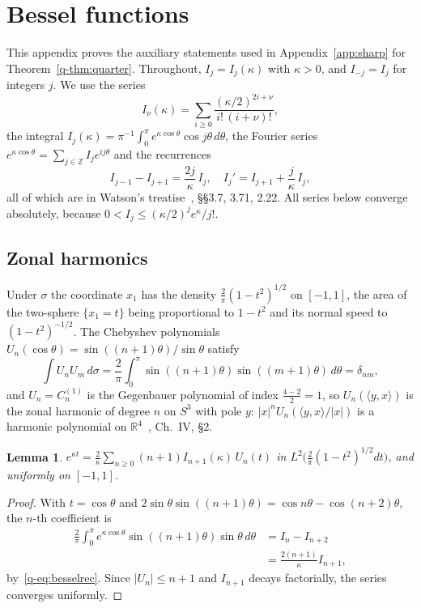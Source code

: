 \documentclass[aps,prd,twocolumn,superscriptaddress,nofootinbib,longbibliography,floatfix,amsmath,amssymb,10pt]{revtex4-2}
\newtheorem{lemma}[theorem]{Lemma}
\theoremstyle{definition}
\theoremstyle{remark}
\newcommand{\R}{\mathbb{R}}
\newcommand{\Z}{\mathbb{Z}}
\newcommand{\ip}[2]{\langle #1,#2\rangle}
\begin{document}
\section{Bessel functions}\label{app:bessel}

This appendix proves the auxiliary statements used in Appendix~\ref{app:sharp}
for Theorem~\ref{q-thm:quarter}. Throughout, $I_j=I_j(\kappa)$ with $\kappa>0$,
and $I_{-j}=I_j$ for integers $j$. We use the series
\[
I_\nu(\kappa)=\sum_{i\ge0}\frac{(\kappa/2)^{2i+\nu}}{i!\,(i+\nu)!},
\]
the integral $I_j(\kappa)=\pi^{-1}\int_0^\pi e^{\kappa\cos\theta}\cos
j\theta\,d\theta$, the Fourier series $e^{\kappa\cos\theta}=\sum_{j\in\Z}
I_je^{ij\theta}$ and the recurrences
\begin{equation}\label{q-eq:besselrec}
I_{j-1}-I_{j+1}=\frac{2j}\kappa\,I_j,\quad I_j'=I_{j+1}+\frac j\kappa\,I_j ,
\end{equation}
all of which are in Watson's treatise~\cite{Wat44}, \S\S3.7, 3.71,
2.22. All series below converge absolutely, because $0<I_j\le(\kappa/2)^j
e^\kappa/j!$.

\subsection{Zonal harmonics}

Under $\sigma$ the coordinate $x_1$ has the density $\frac2\pi(1-t^2)^{1/2}$
on $[-1,1]$, the area of the two-sphere $\{x_1=t\}$ being proportional to
$1-t^2$ and its normal speed to $(1-t^2)^{-1/2}$. The Chebyshev polynomials
$U_n(\cos\theta)=\sin((n+1)\theta)/\sin\theta$ satisfy
\[
\int U_nU_m\,d\sigma=\frac2\pi\int_0^\pi\sin((n+1)\theta)\sin((m+1)\theta)
\,d\theta=\delta_{nm},
\]
and $U_n=C_n^{(1)}$ is the Gegenbauer polynomial of index $\frac{4-2}2=1$, so
$U_n(\ip yx)$ is the zonal harmonic of degree $n$ on $S^3$ with pole $y$:
$|x|^nU_n(\ip yx/|x|)$ is a harmonic polynomial on $\R^4$~\cite{SW71},
Ch.~IV, \S2.

\begin{lemma}\label{q-lem:chebexp}
$e^{\kappa t}=\frac2\kappa\sum_{n\ge0}(n+1)I_{n+1}(\kappa)\,U_n(t)$ in
$L^2\bigl(\frac2\pi(1-t^2)^{1/2}dt\bigr)$, and uniformly on $[-1,1]$.
\end{lemma}

\begin{proof}
With $t=\cos\theta$ and $2\sin\theta\sin((n+1)\theta)=\cos n\theta-\cos(
n+2)\theta$, the $n$-th coefficient is
\[
\begin{aligned}
\frac2\pi\int_0^\pi e^{\kappa\cos\theta}\sin((n+1)\theta)\sin\theta\,d\theta
&=I_n-I_{n+2}\\
&=\frac{2(n+1)}\kappa I_{n+1},
\end{aligned}
\]
by~\eqref{q-eq:besselrec}. Since $|U_n|\le n+1$ and $I_{n+1}$ decays
factorially, the series converges uniformly.
\end{proof}
\end{document}
